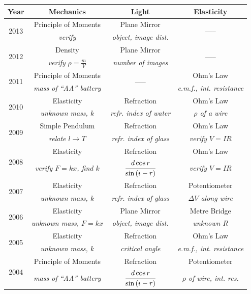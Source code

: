 \begin{center}
\begin{tabular}{|c|c|c|c|} \hline
\textbf{Year} & \textbf{Mechanics} & \textbf{Light} & \textbf{Elasticit}y \\ \hline
\multirow{2}{*}{2013} & Principle of Moments & Plane Mirror & \multirow{2}{*}{-----} \\
& \emph{verify} & \emph{object, image dist.} & \\ \hline
\multirow{2}{*}{2012} & Density & Plane Mirror & \multirow{2}{*}{-----} \\
& \emph{verify} $\rho = \frac{m}{V}$ & \emph{number of images} & \\ \hline
\multirow{2}{*}{2011} & Principle of Moments & \multirow{2}{*}{-----} & Ohm's Law \\
& \emph{mass of ``AA'' battery} & & \emph{e.m.f., int. resistance} \\ \hline
\multirow{2}{*}{2010} & Elasticity & Refraction & Ohm's Law \\
& \emph{unknown mass, $k$} & \emph{refr. index of water} & \emph{$\rho$ of a wire} \\ \hline
\multirow{2}{*}{2009} & Simple Pendulum & Refraction & Ohm's Law \\
& \emph{relate $l \rightarrow T$} & \emph{refr. index of glass} & \emph{verify $V = IR$} \\ \hline
\multirow{2}{*}{2008} & Elasticity & Refraction & Ohm's Law \\
& \emph{verify $F=kx$, find $k$} & \emph{$\cfrac{d\cos{r}}{\sin{(i-r)}}$}  & \emph{verify $V=IR$} \\ \hline
\multirow{2}{*}{2007} & Elasticity & Refraction & Potentiometer \\
& \emph{unknown mass, $k$} & \emph{refr. index of glass} & \emph{$\Delta V$ along wire} \\ \hline
\multirow{2}{*}{2006} & Elasticity & Plane Mirror & Metre Bridge \\
& \emph{unknown mass, $F = kx$} & \emph{object, image dist.} & \emph{unknown $R$} \\ \hline
\multirow{2}{*}{2005} & Elasticity & Refraction & Ohm's Law \\
& \emph{unknown mass, $k$} & \emph{critical angle} & \emph{e.m.f., int. resistance} \\ \hline
\multirow{2}{*}{2004} & Principle of Moments & Refraction & Potentiometer \\
& \emph{mass of ``AA'' battery} & \emph{$\cfrac{d\cos{r}}{\sin{(i-r)}}$} & \emph{$\rho$ of wire, int. res.} \\ \hline
\end{tabular}
\end{center}

